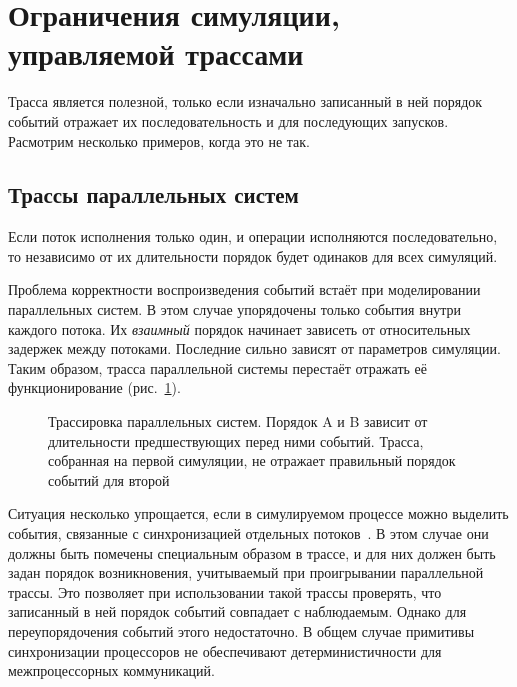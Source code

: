 \section[Ограничения трасс]{Ограничения симуляции, управляемой трассами}

Трасса является полезной, только если изначально записанный в ней порядок событий отражает их последовательность и для последующих запусков. Расмотрим несколько примеров, когда это не так.

\subsection{Трассы параллельных систем}

Если поток исполнения только один, и операции исполняются последовательно, то независимо от их длительности порядок будет одинаков для всех симуляций.

Проблема корректности воспроизведения событий встаёт при моделировании параллельных систем. В этом случае упорядочены только события внутри каждого потока. Их \textit{взаимный} порядок начинает зависеть от относительных задержек между потоками. Последние сильно зависят от параметров симуляции. Таким образом, трасса параллельной системы перестаёт отражать её функционирование (рис.~\ref{fig:trace-parallel}).

\begin{figure}[htp]
    \centering
    \caption[Трассировка параллельных систем]{Трассировка параллельных систем. Порядок A и B зависит от длительности предшествующих перед ними событий. Трасса, собранная на первой симуляции, не отражает правильный порядок событий для второй}
    \label{fig:trace-parallel}
\end{figure}

Ситуация несколько упрощается, если в симулируемом процессе можно выделить события, связанные с синхронизацией отдельных потоков~\cite{DBLP:conf/ispass/RicoDCERV11}. В этом случае они должны быть помечены специальным образом в трассе, и для них должен быть задан порядок возникновения, учитываемый при проигрывании параллельной трассы. Это позволяет при использовании такой трассы проверять, что записанный в ней порядок событий совпадает с наблюдаемым. Однако для переупорядочения событий этого недостаточно. В общем случае примитивы синхронизации процессоров не обеспечивают детерминистичности для межпроцессорных коммуникаций.

